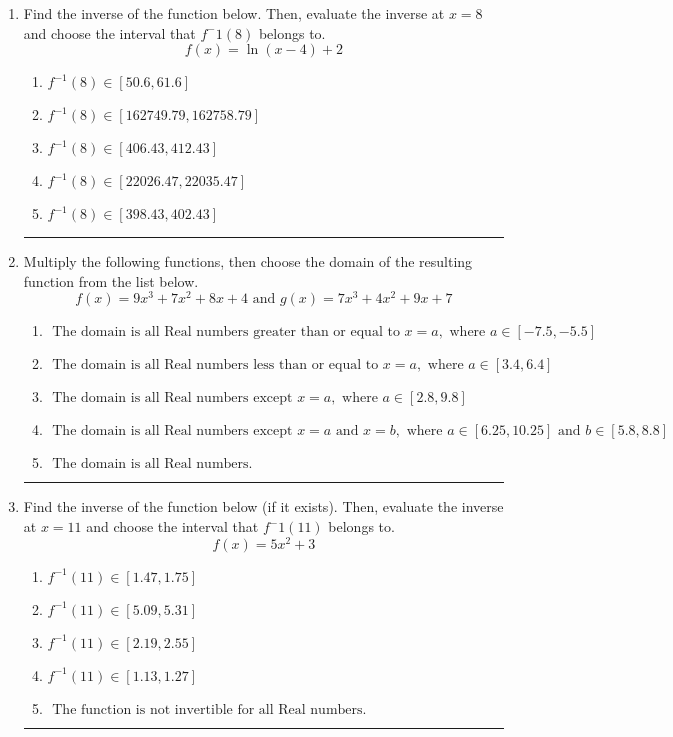 \documentclass[14pt]{extbook}
\newcommand{\litem}[1]{\item#1\hspace*{-1cm}\rule{\textwidth}{0.4pt}}
\begin{document}
\begin{enumerate}
\litem{
Find the inverse of the function below. Then, evaluate the inverse at $x = 8$ and choose the interval that $f^-1(8)$ belongs to.\[ f(x) = \ln{(x-4)}+2 \]\begin{enumerate}[label=\Alph*.]
\item \( f^{-1}(8) \in [50.6, 61.6] \)
\item \( f^{-1}(8) \in [162749.79, 162758.79] \)
\item \( f^{-1}(8) \in [406.43, 412.43] \)
\item \( f^{-1}(8) \in [22026.47, 22035.47] \)
\item \( f^{-1}(8) \in [398.43, 402.43] \)

\end{enumerate} }
\litem{
Multiply the following functions, then choose the domain of the resulting function from the list below.\[ f(x) = 9x^{3} +7 x^{2} +8 x + 4 \text{ and } g(x) = 7x^{3} +4 x^{2} +9 x + 7 \]\begin{enumerate}[label=\Alph*.]
\item \( \text{ The domain is all Real numbers greater than or equal to } x = a, \text{ where } a \in [-7.5, -5.5] \)
\item \( \text{ The domain is all Real numbers less than or equal to } x = a, \text{ where } a \in [3.4, 6.4] \)
\item \( \text{ The domain is all Real numbers except } x = a, \text{ where } a \in [2.8, 9.8] \)
\item \( \text{ The domain is all Real numbers except } x = a \text{ and } x = b, \text{ where } a \in [6.25, 10.25] \text{ and } b \in [5.8, 8.8] \)
\item \( \text{ The domain is all Real numbers. } \)

\end{enumerate} }
\litem{
Find the inverse of the function below (if it exists). Then, evaluate the inverse at $x = 11$ and choose the interval that $f^-1(11)$ belongs to.\[ f(x) = 5 x^2 + 3 \]\begin{enumerate}[label=\Alph*.]
\item \( f^{-1}(11) \in [1.47, 1.75] \)
\item \( f^{-1}(11) \in [5.09, 5.31] \)
\item \( f^{-1}(11) \in [2.19, 2.55] \)
\item \( f^{-1}(11) \in [1.13, 1.27] \)
\item \( \text{ The function is not invertible for all Real numbers. } \)


\end{enumerate}}
\end{enumerate}
\end{document}
